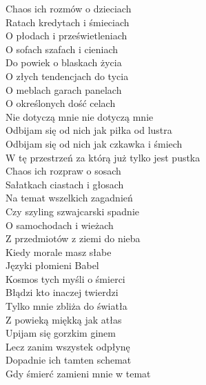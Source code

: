 \begin{text}
    Chaos ich rozmów o dzieciach\\
    Ratach kredytach i śmieciach\\
    O płodach i prześwietleniach\\
    O sofach szafach i cieniach\\
    Do powiek o blaskach życia\\
    O złych tendencjach do tycia\\
    O meblach garach panelach\\
    O określonych dość celach\\
    Nie dotyczą mnie nie dotyczą mnie\\
    Odbijam się od nich jak piłka od lustra\\
    Odbijam się od nich jak czkawka i śmiech\\
    W tę przestrzeń za którą już tylko jest pustka\\
    Chaos ich rozpraw o sosach\\
    Sałatkach ciastach i głosach\\
    Na temat wszelkich zagadnień\\
    Czy szyling szwajcarski spadnie\\
    O samochodach i wieżach\\
    Z przedmiotów z ziemi do nieba\\
    Kiedy morale masz słabe\\
    Języki płomieni Babel\\
    Kosmos tych myśli o śmierci\\
    Błądzi kto inaczej twierdzi\\
    Tylko mnie zbliża do światła\\
    Z powieką miękką jak atłas\\
    Upijam się gorzkim ginem\\
    Lecz zanim wszystek odpłynę\\
    Dopadnie ich tamten schemat\\
    Gdy śmierć zamieni mnie w temat
\end{text}
\begin{chord}

\end{chord}